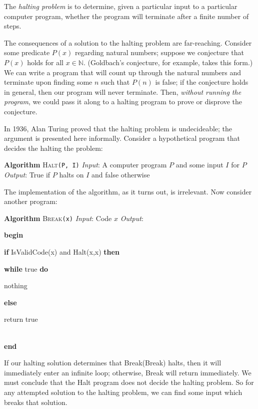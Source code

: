 \documentclass[12pt]{article}
\newcommand{\Lindent}{0.4in}
\newenvironment{Lalgorithm}[4]{
\textbf{Algorithm} \textsc{#1}\texttt{(#2)}\newline
\textit{Input}: #3\newline
\textit{Output}: #4\newline

}{}
\newcommand{\Lgroup}[1]{\textbf{begin}\\\hspace*{\Lindent}\parbox{\textwidth}{#1}\\\textbf{end}}
\newcommand{\Lif}[2]{\textbf{if} #1 \textbf{then}\\\hspace*{\Lindent}\parbox{\textwidth}{#2}}
\newcommand{\Lelse}[1]{\textbf{else}\\\hspace*{\Lindent}\parbox{\textwidth}{#1}}
\newcommand{\Lwhile}[2]{\textbf{while} #1 \textbf{do}\\\hspace*{\Lindent}\parbox{\textwidth}{#2}}
\begin{document}

The \emph{halting problem} is to determine, given a particular input to a particular computer program, whether the program will terminate after a finite number of steps.

The consequences of a solution to the halting problem are far-reaching.  Consider some predicate $P(x)$ regarding natural numbers; suppose we conjecture that $P(x)$ holds for all $x \in \mathbb{N}$.  (Goldbach's conjecture, for example, takes this form.)  We can write a program that will count up through the natural numbers and terminate upon finding some $n$ such that $P(n)$ is false; if the conjecture holds in general, then our program will never terminate.  Then, \emph{without running the program}, we could pass it along to a halting program to prove or disprove the conjecture.

In 1936, Alan Turing proved that the halting problem is undecideable; the argument is presented here informally.  Consider a hypothetical program that decides the halting the problem:

\begin{Lalgorithm}{Halt}{P, I}{A computer program $P$ and some input $I$ for $P$}{True if $P$ halts on $I$ and false otherwise}
\end{Lalgorithm}

The implementation of the algorithm, as it turns out, is irrelevant.  Now consider another program:

\begin{Lalgorithm}{Break}{x}{Code $x$}{}
\Lgroup{
\Lif{IsValidCode(x) and {Halt(x,x)}}{\Lwhile{true}{nothing}}
\Lelse{ return true }
}

\end{Lalgorithm}

If our halting solution determines that Break(Break) halts, then it will immediately enter an infinite loop; otherwise, Break will return immediately.  We must conclude that the Halt program does not decide the halting problem.
So for any attempted solution to the halting problem, we can find some input which breaks that solution.
\end{document}
